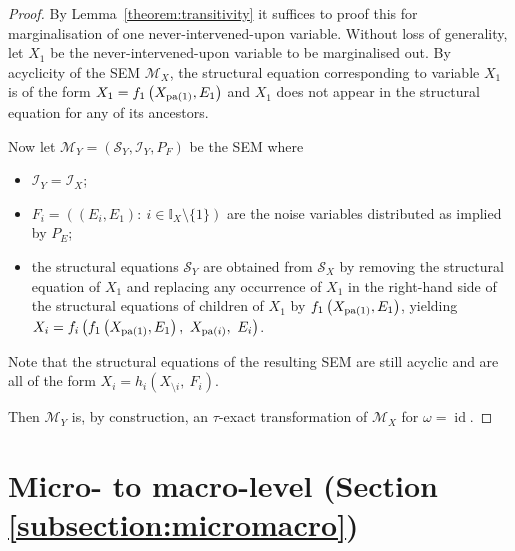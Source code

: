\medskip


\begin{proof}
By Lemma~\ref{theorem:transitivity} it suffices to proof this for marginalisation of one never-intervened-upon variable.
Without loss of generality, let $X_1$ be the never-intervened-upon variable to be marginalised out.
By acyclicity of the SEM $\mathcal{M}_X$, the structural equation corresponding to variable $X_1$ is of the form $X_1 = f_1\left(X_{\operatorname{pa}(1)},E_1\right)$ and $X_1$ does not appear in the structural equation for any of its ancestors.

Now let $\mathcal{M}_Y=(\mathcal{S}_Y,\mathcal{I}_Y,P_F)$ be the SEM where
%
\begin{itemize}
    \item $\mathcal{I}_Y = \mathcal{I}_X$;
    \item $F_i = ((E_i,E_1):\ i \in \mathbb{I}_X\setminus\{1\})$ are the noise variables distributed as implied by $P_E$;
    \item the structural equations $\mathcal{S}_Y$ are obtained from $\mathcal{S}_X$ by removing the structural equation of $X_1$ and replacing any occurrence of $X_1$ in the right-hand side of the structural equations of children of $X_1$ by $f_1\left(X_{\operatorname{pa}(1)},E_1\right)$, yielding $X_i = f_i\left(f_1\left(X_{\pa(1)},E_1\right),\ X_{\pa(i)},\ E_i\right)$.
\end{itemize}
%
Note that the structural equations  of the resulting SEM are still acyclic and are all of the form $X_i = h_i\left(X_{\setminus i},\ F_i\right)$.

Then $\mathcal{M}_Y$ is, by construction, an $\tau$-exact transformation of $\mathcal{M}_X$ for $\omega=\operatorname{id}$.
%
\end{proof}



\section{Micro- to macro-level (Section \ref{subsection:micromacro})}

